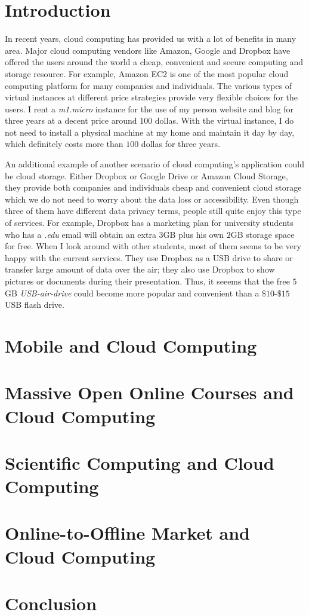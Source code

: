 \section{Introduction}
In recent years, cloud computing has provided us with a lot of benefits in many area. Major cloud computing vendors like Amazon, Google and Dropbox have offered the users around the world a cheap, convenient and secure computing and storage resource. For example, Amazon EC2 is one of the most popular cloud computing platform for many companies and individuals. The various types of virtual instances at different price strategies provide very flexible choices for the users. I rent a \emph{m1.micro} instance for the use of my person website and blog for three years at a decent price around $100$ dollas. With the virtual instance, I do not need to install a physical machine at my home and maintain it day by day, which definitely costs more than $100$ dollas for three years. 

An additional example of another scenario of cloud computing's application could be cloud storage. Either Dropbox or Google Drive or Amazon Cloud Storage, they provide both companies and individuals cheap and convenient cloud storage which we do not need to worry about the data loss or accessibility. Even though three of them have different data privacy terms, people still quite enjoy this type of services. For example, Dropbox has a marketing plan for university students who has a \emph{.edu} email will obtain an extra $3$GB plus his own $2$GB storage space for free. When I look around with other students, most of them seems to be very happy with the current services. They use Dropbox as a USB drive to share or transfer large amount of data over the air; they also use Dropbox to show pictures or documents during their presentation. Thus, it seeems that the free $5$GB \emph{USB-air-drive} could become more popular and convenient than a $\$10$-$\$15$ USB flash drive.

\section{Mobile and Cloud Computing}

\section{Massive Open Online Courses and Cloud Computing}

\section{Scientific Computing and Cloud Computing}

\section{Online-to-Offline Market and Cloud Computing}

\section{Conclusion}
